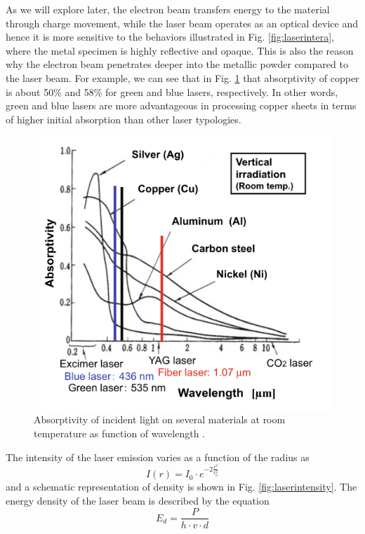 As we will explore later, the electron beam transfers energy to the material through charge movement, while the laser beam operates as an optical device and hence it is more sensitive to the behaviors illustrated in Fig. \ref{fig:laserintera}, where the metal specimen is highly reflective and opaque. This is also the reason why the electron beam penetrates deeper into the metallic powder compared to the laser beam. For example, we can see that in Fig. \ref{fig:ondette} that absorptivity of copper is about 50\% and 58\% for green and blue lasers, respectively. In other words, green and blue lasers are more advantageous in processing copper sheets in terms of higher initial absorption than other laser typologies.
\begin{figure}
    \centering
    \includegraphics[scale=0.4]{Images/ondette.png}
    \caption[Material absorptivity as function of wavelength.]{Absorptivity of incident light on several materials at room temperature as function of wavelength \cite{katayama_fundamentals_2020}.}
    \label{fig:ondette}
\end{figure}
The intensity of the laser emission varies as a function of the radius as 
\begin{equation}
    \label{eq:intensitylaser}
    I(r)=I_0\cdot e^{-2 \frac{r^2}{r_0^2}}
\end{equation}
and a schematic representation of density is shown in Fig. \ref{fig:laserintensity}.
The energy density of the laser beam is described by the equation
\begin{equation}
    \label{eq:energydensity}
    E_d = \frac{P}{h\cdot v \cdot d}
\end{equation}

